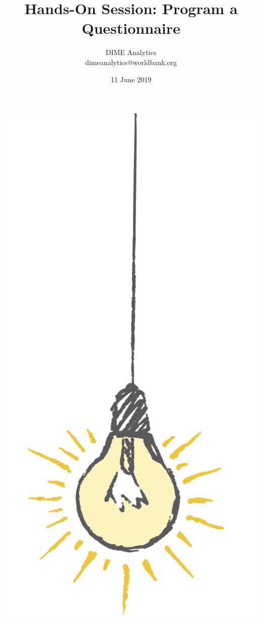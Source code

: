 \documentclass{tufte-handout}
\title{Hands-On Session: Program a Questionnaire}
\author{DIME Analytics \\ dimeanalytics@worldbank.org}
\date{11 June 2019}  %
\begin{document}
\maketitle%

\begin{marginfigure}%
  \includegraphics[width=\linewidth]{img/light.png}
\end{marginfigure}
\end{document}
